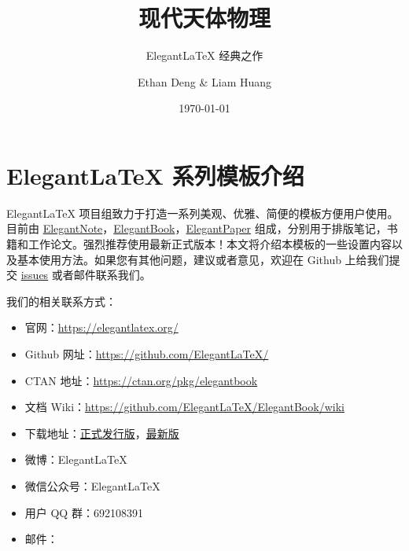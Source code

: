 \documentclass[cn,11pt]{elegantbook}
\title{现代天体物理}
\subtitle{Elegant\LaTeX{} 经典之作}
\author{Ethan Deng \& Liam Huang}
\institute{Elegant\LaTeX{} Program}
\date{\today}
\begin{document}
\maketitle
\tableofcontents


\mainmatter
\hypersetup{pageanchor=true}

\chapter{Elegant\LaTeX{} 系列模板介绍}


Elegant\LaTeX{} 项目组致力于打造一系列美观、优雅、简便的模板方便用户使用。目前由 \href{https://github.com/ElegantLaTeX/ElegantNote}{ElegantNote}，\href{https://github.com/ElegantLaTeX/ElegantBook}{ElegantBook}，\href{https://github.com/ElegantLaTeX/ElegantPaper}{ElegantPaper} 组成，分别用于排版笔记，书籍和工作论文。强烈推荐使用最新正式版本！本文将介绍本模板的一些设置内容以及基本使用方法。如果您有其他问题，建议或者意见，欢迎在 Github 上给我们提交 \href{https://github.com/ElegantLaTeX/ElegantBook/issues}{issues} 或者邮件联系我们。

我们的相关联系方式：
\begin{itemize}
\item 官网：\href{https://elegantlatex.org/}{https://elegantlatex.org/}
\item Github 网址：\href{https://github.com/ElegantLaTeX/}{https://github.com/ElegantLaTeX/}
\item CTAN 地址：\href{https://ctan.org/pkg/elegantbook}{https://ctan.org/pkg/elegantbook}
\item 文档 Wiki：\href{https://github.com/ElegantLaTeX/ElegantBook/wiki}{https://github.com/ElegantLaTeX/ElegantBook/wiki}
\item 下载地址：\href{https://github.com/ElegantLaTeX/ElegantBook/releases}{正式发行版}，\href{https://github.com/ElegantLaTeX/ElegantBook/archive/master.zip}{最新版}
\item 微博：ElegantLaTeX
\item 微信公众号：ElegantLaTeX
\item 用户 QQ 群：692108391 
\item 邮件：
\end{itemize}
\end{document}
